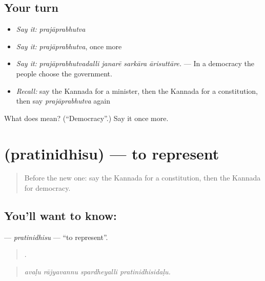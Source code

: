 \subsection*{Your turn}
\begin{itemize}
\raggedright
  \item \emph{Say it:} \emph{prajāprabhutva}
  \item \emph{Say it:} \emph{prajāprabhutva}, once more
  \item \emph{Say it:} \emph{prajāprabhutvadalli janarē sarkāra ārisuttāre.} — In a democracy the people choose the government.
  \item \emph{Recall:} say the Kannada for a minister, then the Kannada for a constitution, then say \emph{prajāprabhutva} again
\end{itemize}

\begin{tcolorbox}[breakable,colback=teal!4,colframe=teal!35!black,title={Before you move on}]
What does  mean? (\textquotedblleft{}Democracy\textquotedblright{}.) Say it once more.
\end{tcolorbox}
\section[\texorpdfstring{\kn{ಪ್ರತಿನಿಧಿಸು} (pratinidhisu)}{ಪ್ರತಿನಿಧಿಸು (pratinidhisu)}]{ (pratinidhisu) — to represent}

\label{lesson:KA-C393-pratinidhisu}



\begin{quote}
Before the new one: say the Kannada for a constitution, then the Kannada for democracy.
\end{quote}

\subsection*{You'll want to know: }
\textbf{} — \emph{pratinidhisu} — \textquotedblleft{}to represent\textquotedblright{}.

\begin{quote}
   .
\end{quote}

\begin{quote}
\emph{avaḷu rājyavannu spardheyalli pratinidhisidaḷu.}
\end{quote}

